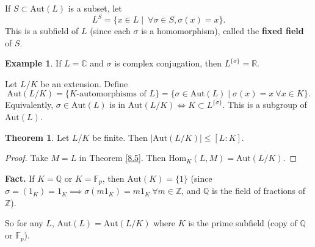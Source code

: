 \documentclass{article}
\theoremstyle{definition}
\newtheorem{theorem}{Theorem}[section]
\newtheorem{example}{Example}[section]
\begin{document}
If $S \subset \text{Aut}(L)$ is a subset, let \[
L^S = \{ x \in L \mid ~\forall \sigma \in S, \sigma(x)=x\}.
\]
This is a subfield of $L$ (since each $\sigma$ is a homomorphism), called the \textbf{fixed field} of $S$.
\begin{example}
    If $L=\mathbb{C}$ and $\sigma$ is complex conjugation, then $L^{\{\sigma\}}=\mathbb{R}$.
\end{example}
Let $L/K$ be an extension. Define \[
\text{Aut}(L/K)= \{K\text{-automorphisms of }L\} = \{\sigma \in \text{Aut}(L) \mid \sigma(x)=x ~\forall x \in K\}.
\]
Equivalently, $\sigma \in \text{Aut}(L)$ is in $\text{Aut}(L/K) \iff K \subset L^{\{\sigma\}}$. This is a subgroup of $\text{Aut}(L)$.
\begin{theorem}\label{9.1}
    Let $L/K$ be finite. Then $|\text{Aut}(L/K)| \le [L:K]$.
\end{theorem}
\begin{proof}
    Take $M=L$ in Theorem \ref{8.5}. Then $\text{Hom}_K(L,M) = \text{Aut}(L/K)$.
\end{proof}


\textbf{Fact.} If $K=\mathbb{Q}$ or $K=\mathbb{F}_p$, then $\text{Aut}(K)=\{1\}$ (since $\sigma=(1_K)=1_K \implies \sigma(m 1_K) = m 1_K ~\forall m \in \mathbb{Z}$, and $\mathbb{Q}$ is the field of fractions of $\mathbb{Z}$).

So for any $L$, $\text{Aut}(L)=\text{Aut}(L/K)$ where $K$ is the prime subfield (copy of $\mathbb{Q}$ or $\mathbb{F}_p$).
\vspace{1mm}
\end{document}
